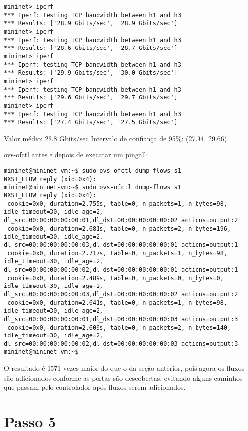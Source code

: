 \documentclass[12pt,letterpaper]{article}
\begin{document}
\begin{verbatim}
mininet> iperf 
*** Iperf: testing TCP bandwidth between h1 and h3 
*** Results: ['28.9 Gbits/sec', '28.9 Gbits/sec'] 
mininet> iperf 
*** Iperf: testing TCP bandwidth between h1 and h3 
*** Results: ['28.6 Gbits/sec', '28.7 Gbits/sec'] 
mininet> iperf 
*** Iperf: testing TCP bandwidth between h1 and h3 
*** Results: ['29.9 Gbits/sec', '30.0 Gbits/sec'] 
mininet> iperf 
*** Iperf: testing TCP bandwidth between h1 and h3 
*** Results: ['29.6 Gbits/sec', '29.7 Gbits/sec'] 
mininet> iperf 
*** Iperf: testing TCP bandwidth between h1 and h3 
*** Results: ['27.4 Gbits/sec', '27.5 Gbits/sec']
\end{verbatim}

Valor médio: 28.8 Gbits/sec
Intervalo de confiança de 95\%: (27.94, 29.66)

ovs-ofctl antes e depois de executar um pingall:
\begin{verbatim}
mininet@mininet-vm:~$ sudo ovs-ofctl dump-flows s1
NXST_FLOW reply (xid=0x4):
mininet@mininet-vm:~$ sudo ovs-ofctl dump-flows s1
NXST_FLOW reply (xid=0x4):
 cookie=0x0, duration=2.755s, table=0, n_packets=1, n_bytes=98, idle_timeout=30, idle_age=2, dl_src=00:00:00:00:00:01,dl_dst=00:00:00:00:00:02 actions=output:2
 cookie=0x0, duration=2.681s, table=0, n_packets=2, n_bytes=196, idle_timeout=30, idle_age=2, dl_src=00:00:00:00:00:03,dl_dst=00:00:00:00:00:01 actions=output:1
 cookie=0x0, duration=2.717s, table=0, n_packets=1, n_bytes=98, idle_timeout=30, idle_age=2, dl_src=00:00:00:00:00:02,dl_dst=00:00:00:00:00:01 actions=output:1
 cookie=0x0, duration=2.489s, table=0, n_packets=0, n_bytes=0, idle_timeout=30, idle_age=2, dl_src=00:00:00:00:00:03,dl_dst=00:00:00:00:00:02 actions=output:2
 cookie=0x0, duration=2.641s, table=0, n_packets=1, n_bytes=98, idle_timeout=30, idle_age=2, dl_src=00:00:00:00:00:01,dl_dst=00:00:00:00:00:03 actions=output:3
 cookie=0x0, duration=2.609s, table=0, n_packets=2, n_bytes=140, idle_timeout=30, idle_age=2, dl_src=00:00:00:00:00:02,dl_dst=00:00:00:00:00:03 actions=output:3
mininet@mininet-vm:~$ 
\end{verbatim}

O resultado é 1571 vezes maior do que o da seção anterior, pois agora os fluxos são adicionados conforme
as portas são descobertas, evitando alguns caminhos que passam pelo controlador após fluxos serem adicionados.

\section{Passo 5}
\end{document}
